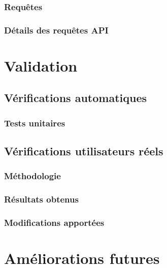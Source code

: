 \documentclass{EPL-master-thesis-covers-FR}
\begin{document}
		

			\subsection*{Requêtes}

			

			\subsection*{Détails des requêtes API}
				\label{sec:api}

			

	\chapter{Validation}


		\section{Vérifications automatiques}

			\subsection*{Tests unitaires}

			

		\section{Vérifications utilisateurs réels}


			\subsection*{Méthodologie}

				

			\subsection*{Résultats obtenus}

				

			\subsection*{Modifications apportées}

		

	\chapter{Améliorations futures}
\end{document}
